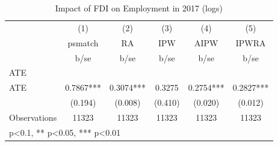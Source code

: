 \begin{table}[htbp]\centering
\def\sym#1{\ifmmode^{#1}\else\(^{#1}\)\fi}
\caption{Impact of FDI on Employment in 2017 (logs) \label{ates\_emp}}
\begin{tabular}{l*{5}{c}}
\hline\hline
                &\multicolumn{1}{c}{(1)}&\multicolumn{1}{c}{(2)}&\multicolumn{1}{c}{(3)}&\multicolumn{1}{c}{(4)}&\multicolumn{1}{c}{(5)}\\
                &\multicolumn{1}{c}{psmatch}&\multicolumn{1}{c}{RA}&\multicolumn{1}{c}{IPW}&\multicolumn{1}{c}{AIPW}&\multicolumn{1}{c}{IPWRA}\\
                &     b/se   &     b/se   &     b/se   &     b/se   &     b/se   \\
\hline
ATE             &            &            &            &            &            \\
ATE             &   0.7867***&   0.3074***&   0.3275   &   0.2754***&   0.2827***\\
                &  (0.194)   &  (0.008)   &  (0.410)   &  (0.020)   &  (0.012)   \\
\hline
Observations    &    11323   &    11323   &    11323   &    11323   &    11323   \\
\hline\hline
\multicolumn{6}{l}{\footnotesize * p<0.1, ** p<0.05, *** p<0.01}\\
\end{tabular}
\end{table}
